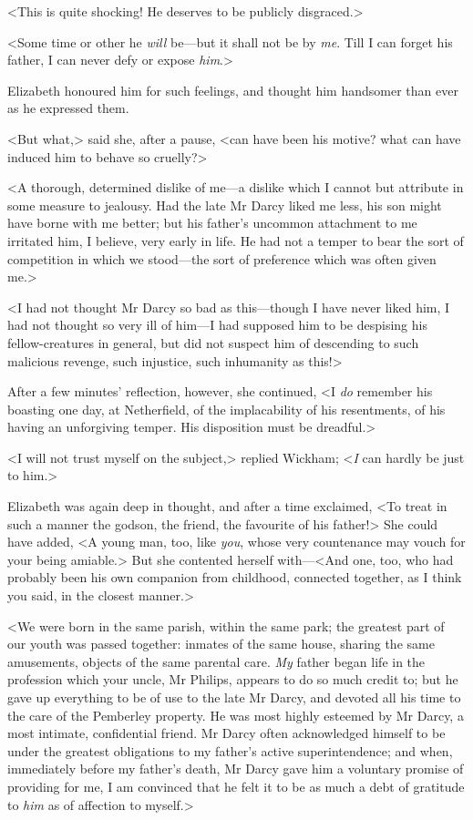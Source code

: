 <This is quite shocking! He deserves to be publicly disgraced.>

<Some time or other he \textit{will} be—but it shall not be by \textit{me}. Till I can forget his father, I can never defy or expose \textit{him}.>

Elizabeth honoured him for such feelings, and thought him handsomer than ever as he expressed them.

<But what,> said she, after a pause, <can have been his motive? what can have induced him to behave so cruelly?>

<A thorough, determined dislike of me—a dislike which I cannot but attribute in some measure to jealousy. Had the late Mr Darcy liked me less, his son might have borne with me better; but his father's uncommon attachment to me irritated him, I believe, very early in life. He had not a temper to bear the sort of competition in which we stood—the sort of preference which was often given me.>

<I had not thought Mr Darcy so bad as this—though I have never liked him, I had not thought so very ill of him—I had supposed him to be despising his fellow-creatures in general, but did not suspect him of descending to such malicious revenge, such injustice, such inhumanity as this!>

After a few minutes' reflection, however, she continued, <I \textit{do} remember his boasting one day, at Netherfield, of the implacability of his resentments, of his having an unforgiving temper. His disposition must be dreadful.>

<I will not trust myself on the subject,> replied Wickham; <\textit{I} can hardly be just to him.>

Elizabeth was again deep in thought, and after a time exclaimed, <To treat in such a manner the godson, the friend, the favourite of his father!> She could have added, <A young man, too, like \textit{you}, whose very countenance may vouch for your being amiable.> But she contented herself with—<And one, too, who had probably been his own companion from childhood, connected together, as I think you said, in the closest manner.>

<We were born in the same parish, within the same park; the greatest part of our youth was passed together: inmates of the same house, sharing the same amusements, objects of the same parental care. \textit{My} father began life in the profession which your uncle, Mr Philips, appears to do so much credit to; but he gave up everything to be of use to the late Mr Darcy, and devoted all his time to the care of the Pemberley property. He was most highly esteemed by Mr Darcy, a most intimate, confidential friend. Mr Darcy often acknowledged himself to be under the greatest obligations to my father's active superintendence; and when, immediately before my father's death, Mr Darcy gave him a voluntary promise of providing for me, I am convinced that he felt it to be as much a debt of gratitude to \textit{him} as of affection to myself.>

